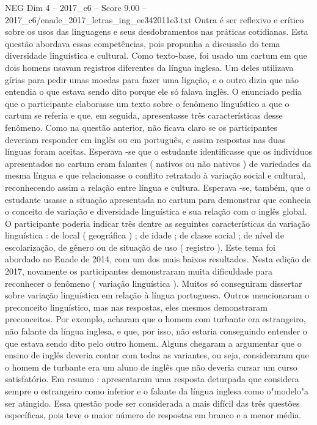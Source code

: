 \begin{textsample}{NEG Dim 4 – 2017\_c6 – Score 9.00 – 2017\_c6/enade\_2017\_letras\_ing\_ee342011e3.txt}
Outra é ser reflexivo e crítico sobre os usos das linguagens e seus desdobramentos nas práticas cotidianas.
Esta questão abordava essas competências, pois propunha a discussão do tema diversidade linguística e cultural.
Como texto-base, foi usado um cartum em que dois homens usavam registros diferentes da língua inglesa.
Um deles utilizava gírias para pedir umas moedas para fazer uma ligação, e o outro dizia que não entendia o que estava sendo dito porque ele só falava inglês.
O enunciado pedia que o participante elaborasse um texto sobre o fenômeno linguístico a que o cartum se referia e que, em seguida, apresentasse três características desse fenômeno.
Como na questão anterior, não ficava claro se os participantes deveriam responder em inglês ou em português, e assim respostas nas duas línguas foram aceitas.
Esperava -se que o estudante identificasse que os indivíduos apresentados no cartum eram falantes ( nativos ou não nativos ) de variedades da mesma língua e que relacionasse o conflito retratado à variação social e cultural, reconhecendo assim a relação entre língua e cultura.
Esperava -se, também, que o estudante usasse a situação apresentada no cartum para demonstrar que conhecia o conceito de variação e diversidade linguística e sua relação com o inglês global.
O participante poderia indicar três dentre as seguintes características da variação linguística : de local ( geográfica ) ; de idade ; de classe social ; de nível de escolarização, de gênero ou de situação de uso ( registro ).
Este tema foi abordado no Enade de 2014, com um dos mais baixos resultados.
Nesta edição de 2017, novamente os participantes demonstraram muita dificuldade para reconhecer o fenômeno ( variação linguística ).
Muitos só conseguiram dissertar sobre variação linguística em relação à língua portuguesa.
Outros mencionaram o preconceito linguístico, mas nas respostas, eles mesmos demonstraram preconceitos.
Por exemplo, acharam que o homem com turbante era estrangeiro, não falante da língua inglesa, e que, por isso, não estaria conseguindo entender o que estava sendo dito pelo outro homem.
Alguns chegaram a argumentar que o ensino de inglês deveria contar com todas as variantes, ou seja, consideraram que o homem de turbante era um aluno de inglês que não deveria cursar um curso satisfatório.
Em resumo : apresentaram uma resposta deturpada que considera sempre o estrangeiro como inferior e o falante da língua inglesa como o"modelo"a ser atingido.
Essa questão pode ser considerada a mais difícil das três questões específicas, pois teve o maior número de respostas em branco e a menor média.

\end{textsample}
